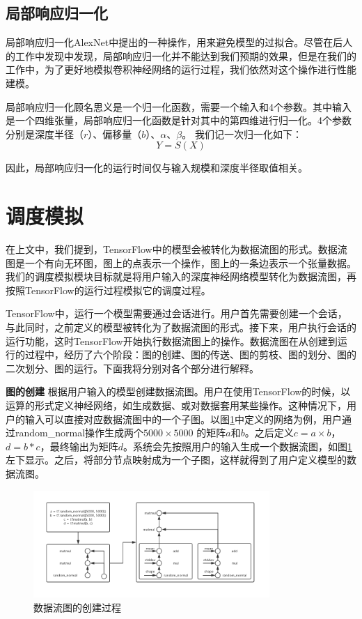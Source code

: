 \subsection{局部响应归一化}
    局部响应归一化AlexNet中提出的一种操作，用来避免模型的过拟合。尽管在后人的工作\cite{vggnet}中发现中发现，局部响应归一化并不能达到我们预期的效果，但是在我们的工作中，为了更好地模拟卷积神经网络的运行过程，我们依然对这个操作进行性能建模。
    
    局部响应归一化顾名思义是一个归一化函数，需要一个输入和4个参数。其中输入是一个四维张量，局部响应归一化函数是针对其中的第四维进行归一化。4个参数分别是深度半径（$ r $）、偏移量（$ b $）、$ \alpha $、$ \beta $。
    我们记一次归一化如下：
    $$
        Y = S(X)
    $$
    
    因此，局部响应归一化的运行时间仅与输入规模和深度半径取值相关。


\section{调度模拟}
    在上文中，我们提到，TensorFlow中的模型会被转化为数据流图的形式。数据流图是一个有向无环图，图上的点表示一个操作，图上的一条边表示一个张量数据。我们的调度模拟模块目标就是将用户输入的深度神经网络模型转化为数据流图，再按照TensorFlow的运行过程模拟它的调度过程。

    TensorFlow中，运行一个模型需要通过会话进行。用户首先需要创建一个会话，与此同时，之前定义的模型被转化为了数据流图的形式。接下来，用户执行会话的运行功能，这时TensorFlow开始执行数据流图上的操作。数据流图在从创建到运行的过程中，经历了六个阶段：图的创建、图的传送、图的剪枝、图的划分、图的二次划分、图的运行。下面我将分别对各个部分进行解释。

    {\bfseries 图的创建} 根据用户输入的模型创建数据流图。用户在使用TensorFlow的时候，以运算的形式定义神经网络，如生成数据、或对数据套用某些操作。这种情况下，用户的输入可以直接对应数据流图中的一个子图。以图\ref{fig:dag_mat}中定义的网络为例，用户通过random\_normal操作生成两个$ 5000 \times 5000 $ 的矩阵$ a $和$ b $。之后定义$ c = a \times b $，$ d = b * c $，最终输出为矩阵$ d $。系统会先按照用户的输入生成一个数据流图，如图\ref{fig:dag_mat}左下显示。之后，将部分节点映射成为一个子图，这样就得到了用户定义模型的数据流图。

    \begin{figure}[!htbp]
        \centering
        \includegraphics[width=0.8\textwidth]{figures/dag_mat.jpg}
        \caption{数据流图的创建过程}
        \label{fig:dag_mat}
    \end{figure}


